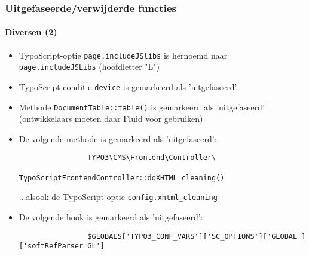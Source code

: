 \begin{frame}[fragile]
	\frametitle{Uitgefaseerde/verwijderde functies}
	\framesubtitle{Diversen (2)}

	\begin{itemize}
		\item TypoScript-optie \texttt{page.includeJSlibs} is hernoemd naar \texttt{page.includeJSLibs}
			 (hoofdletter "L") 

		\item TypoScript-conditie \texttt{device} is gemarkeerd als 'uitgefaseerd'

		\item Methode \texttt{DocumentTable::table()} is gemarkeerd als 'uitgefaseerd'
			\small(ontwikkelaars moeten daar Fluid voor gebruiken)\normalsize

		\item De volgende methode is gemarkeerd als 'uitgefaseerd':
			\begin{lstlisting}
				TYPO3\CMS\Frontend\Controller\
				    TypoScriptFrontendController::doXHTML_cleaning()
			\end{lstlisting}
			...alsook de TypoScript-optie
			\small
				\texttt{config.xhtml\_cleaning}
			\normalsize

		\item De volgende hook is gemarkeerd als 'uitgefaseerd':
			\begin{lstlisting}
				$GLOBALS['TYPO3_CONF_VARS']['SC_OPTIONS']['GLOBAL']['softRefParser_GL']
			\end{lstlisting}
 
	\end{itemize}

\end{frame}


